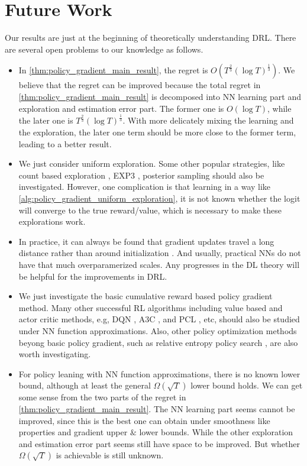 \section{Future Work}
\label{sec:future_work}

Our results are just at the beginning of theoretically understanding DRL. There are several open problems to our knowledge as follows.
\begin{itemize}
    \item In \cref{thm:policy_gradient_main_result}, the regret is $O\left( T^{\frac{2}{3} } \left(\log{T}\right)^{\frac{1}{3}}\right)$. We believe that the regret can be improved because the total regret in \cref{thm:policy_gradient_main_result} is decomposed into NN learning part and exploration and estimation error part. The former one is $O\left(\log{T}\right)$, while the later one is $T^{\frac{2}{3} } \left(\log{T}\right)^{\frac{1}{3}}$. With more delicately mixing the learning and the exploration, the later one term should be more close to the former term, leading to a better result.
    \item We just consider uniform exploration. Some other popular strategies, like count based exploration \cite{auer2002finite}, EXP3 \citep{seldin2014one}, posterior sampling \citep{agrawal2012analysis} should also be investigated. However, one complication is that learning in a way like \cref{alg:policy_gradient_uniform_exploration}, it is not known whether the logit will converge to the true reward/value, which is necessary to make these explorations work.
    \item In practice, it can always be found that gradient updates travel a long distance rather than around initialization \citep{liu2018deeptracker}. And usually, practical NNs do not have that much overparamerized scales. Any progresses in the DL theory will be helpful for the  improvements in DRL.
    \item We just investigate the basic cumulative reward based policy gradient method. Many other successful RL algorithms including value based and actor critic methods, e.g, DQN \cite{mnih2015human}, A3C \citep{mnih2016asynchronous}, and PCL \citep{nachum2017bridging}, etc, should also be studied under NN function approximations. Also, other policy optimization methods beyong basic policy gradient, such as relative entropy policy search \citep{peters2010relative}, are also worth investigating.
    \item For policy leaning with NN function approximations, there is no known lower bound, although at least the general $\Omega\left(\sqrt{T}\right)$ lower bound holds. We can get some sense from the two parts of the regret in \cref{thm:policy_gradient_main_result}. The NN learning part seems cannot be improved, since this is the best one can obtain under smoothness like properties and gradient upper $\&$ lower bounds. While the other exploration and estimation error part seems still have space to be improved. But whether $\Omega\left(\sqrt{T}\right)$ is achievable is still unknown.
\end{itemize}

\nocite{langley00}
\fi
